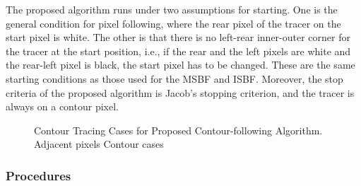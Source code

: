 The proposed algorithm runs under two assumptions for starting. One is the general condition for pixel following, where the rear pixel of the tracer on the start pixel is white. The other is that there is no left-rear inner-outer corner for the tracer at the start position, i.e., if the rear and the left pixels are white and the rear-left pixel is black, the start pixel has to be changed. These are the same starting conditions as those used for the MSBF and ISBF. Moreover, the stop criteria of the proposed algorithm is Jacob's stopping criterion, and the tracer is always on a contour pixel. 

\begin{figure}[htbp]
	\centering

	\caption{Contour Tracing Cases for Proposed Contour-following Algorithm. \protect{} Adjacent pixels \protect{} Contour cases}
	\label{fig:image9}
\end{figure}


\subsubsection{Procedures}


